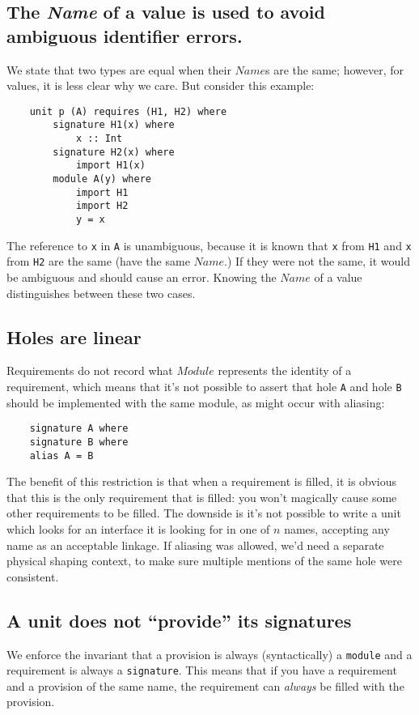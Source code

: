 \documentclass{article}
\newcommand{\I}[1]{\ensuremath{\mathit{#1}}}
\begin{document}
\subsection{The \textit{Name} of a value is used to avoid
ambiguous identifier errors.}
We state that two types
are equal when their \I{Name}s are the same; however,
for values, it is less clear why we care.  But consider this example:

\begin{verbatim}
    unit p (A) requires (H1, H2) where
        signature H1(x) where
            x :: Int
        signature H2(x) where
            import H1(x)
        module A(y) where
            import H1
            import H2
            y = x
\end{verbatim}
The reference to \verb|x| in \verb|A| is unambiguous, because it is known
that \verb|x| from \verb|H1| and \verb|x| from \verb|H2| are the same (have
the same \I{Name}.)  If they were not the same, it would be ambiguous and
should cause an error.  Knowing the \I{Name} of a value distinguishes
between these two cases.

\subsection{Holes are linear}
Requirements do not record what \I{Module} represents
the identity of a requirement, which means that it's not possible to assert
that hole \verb|A| and hole \verb|B| should be implemented with the same module,
as might occur with aliasing:

\begin{verbatim}
    signature A where
    signature B where
    alias A = B
\end{verbatim}
%
The benefit of this restriction is that when a requirement is filled,
it is obvious that this is the only requirement that is filled: you won't
magically cause some other requirements to be filled.  The downside is
it's not possible to write a unit which looks for an interface it is
looking for in one of $n$ names, accepting any name as an acceptable linkage.
If aliasing was allowed, we'd need a separate physical shaping context,
to make sure multiple mentions of the same hole were consistent.

\subsection{A unit does not ``provide'' its signatures}
We enforce the invariant that
a provision is always (syntactically) a \verb|module| and a requirement
is always a \verb|signature|.  This means that if you have a requirement
and a provision of the same name, the requirement can \emph{always} be filled
with the provision.
\end{document}
